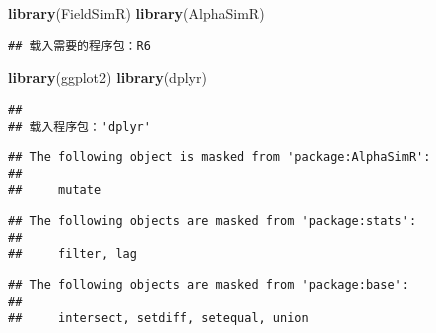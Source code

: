 \documentclass[
]{article}
\author{}
\date{\vspace{-2.5em}}
\newenvironment{Shaded}{\begin{snugshade}}{\end{snugshade}}
\newcommand{\FunctionTok}[1]{\textcolor[rgb]{0.13,0.29,0.53}{\textbf{#1}}}
\newcommand{\NormalTok}[1]{#1}
\begin{document}
\begin{Shaded}
\begin{Highlighting}[]
\FunctionTok{library}\NormalTok{(FieldSimR)}
\FunctionTok{library}\NormalTok{(AlphaSimR)}
\end{Highlighting}
\end{Shaded}

\begin{verbatim}
## 载入需要的程序包：R6
\end{verbatim}

\begin{Shaded}
\begin{Highlighting}[]
\FunctionTok{library}\NormalTok{(ggplot2)}
\FunctionTok{library}\NormalTok{(dplyr)}
\end{Highlighting}
\end{Shaded}

\begin{verbatim}
## 
## 载入程序包：'dplyr'
\end{verbatim}

\begin{verbatim}
## The following object is masked from 'package:AlphaSimR':
## 
##     mutate
\end{verbatim}

\begin{verbatim}
## The following objects are masked from 'package:stats':
## 
##     filter, lag
\end{verbatim}

\begin{verbatim}
## The following objects are masked from 'package:base':
## 
##     intersect, setdiff, setequal, union
\end{verbatim}
\end{document}
